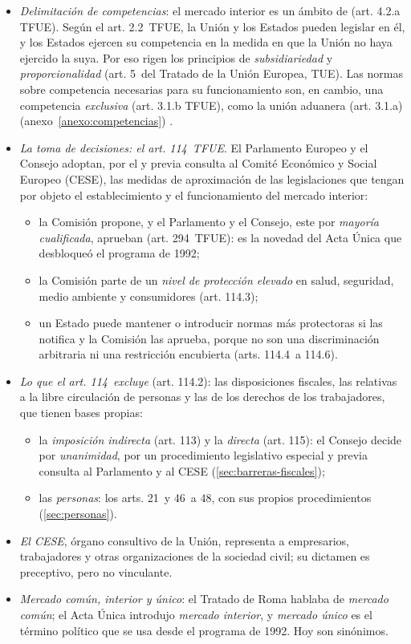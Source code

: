 \documentclass[11pt]{article}
\begin{document}
\begin{itemize}
\item \emph{Delimitación de competencias}: el mercado interior es un ámbito de  (art. 4.2.a TFUE). Según el art. 2.2~TFUE, la Unión y los Estados pueden legislar en él, y los Estados ejercen su competencia en la medida en que la Unión no haya ejercido la suya. Por eso rigen los principios de \emph{subsidiariedad} y \emph{proporcionalidad} (art. 5~del Tratado de la Unión Europea, TUE). Las normas sobre competencia necesarias para su funcionamiento son, en cambio, una competencia \emph{exclusiva} (art. 3.1.b TFUE), como la unión aduanera (art. 3.1.a) (anexo~\ref{anexo:competencias}) .
\item \emph{La toma de decisiones: el art. 114~TFUE}. El Parlamento Europeo y el Consejo adoptan, por el  y previa consulta al Comité Económico y Social Europeo (CESE), las medidas de aproximación de las legislaciones que tengan por objeto el establecimiento y el funcionamiento del mercado interior:
  \begin{itemize}
  \item la Comisión propone, y el Parlamento y el Consejo, este por \emph{mayoría cualificada}, aprueban (art. 294~TFUE): es la novedad del Acta Única que desbloqueó el programa de 1992;
  \item la Comisión parte de un \emph{nivel de protección elevado} en salud, seguridad, medio ambiente y consumidores (art. 114.3);
  \item un Estado puede mantener o introducir normas más protectoras si las notifica y la Comisión las aprueba, porque no son una discriminación arbitraria ni una restricción encubierta (arts. 114.4~a 114.6).
  \end{itemize}
\item \emph{Lo que el art. 114~excluye} (art. 114.2): las disposiciones fiscales, las relativas a la libre circulación de personas y las de los derechos de los trabajadores, que tienen bases propias:
  \begin{itemize}
  \item la \emph{imposición indirecta} (art. 113) y la \emph{directa} (art. 115): el Consejo decide por \emph{unanimidad}, por un procedimiento legislativo especial y previa consulta al Parlamento y al CESE (\ref{sec:barreras-fiscales});
  \item las \emph{personas}: los arts. 21~y 46~a 48, con sus propios procedimientos (\ref{sec:personas}).
  \end{itemize}
\item \emph{El CESE}, órgano consultivo de la Unión, representa a empresarios, trabajadores y otras organizaciones de la sociedad civil; su dictamen es preceptivo, pero no vinculante.
\item \emph{Mercado común, interior y único}: el Tratado de Roma hablaba de \emph{mercado común}; el Acta Única introdujo \emph{mercado interior}, y \emph{mercado único} es el término político que se usa desde el programa de 1992. Hoy son sinónimos.
\end{itemize}
\end{document}
